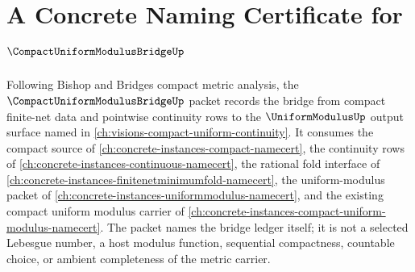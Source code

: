 \chapter{A Concrete Naming Certificate for $\CompactUniformModulusBridgeUp$}
\label{ch:concrete-instances-compact-uniform-modulus-bridge-namecert}

Following Bishop and Bridges compact metric analysis, the $\CompactUniformModulusBridgeUp$ packet records the bridge from compact finite-net data and pointwise continuity rows to the $\UniformModulusUp$ output surface named in \autoref{ch:visions-compact-uniform-continuity}. It consumes the compact source of \autoref{ch:concrete-instances-compact-namecert}, the continuity rows of \autoref{ch:concrete-instances-continuous-namecert}, the rational fold interface of \autoref{ch:concrete-instances-finitenetminimumfold-namecert}, the uniform-modulus packet of \autoref{ch:concrete-instances-uniformmodulus-namecert}, and the existing compact uniform modulus carrier of \autoref{ch:concrete-instances-compact-uniform-modulus-namecert}. The packet names the bridge ledger itself; it is not a selected Lebesgue number, a host modulus function, sequential compactness, countable choice, or ambient completeness of the metric carrier.

